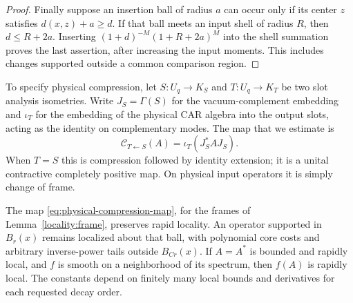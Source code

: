 \begin{proof}
Finally suppose an insertion ball of radius $a$ can occur only if
its center $z$ satisfies $d(x,z)+a\geq d$.  If that ball meets an
input shell of radius $R$, then $d\leq R+2a$.  Inserting
$(1+d)^{-M}(1+R+2a)^M$ into the shell summation proves the last
assertion, after increasing the input moments.  This includes changes
supported outside a common comparison region.
\end{proof}

To specify physical compression, let $S:U_q\to K_S$ and
$T:U_q\to K_T$ be two slot analysis isometries.  Write $J_S=\Gamma(S)$
for the vacuum-complement embedding and $\iota_T$ for the embedding of
the physical CAR algebra into the output slots, acting as the identity
on complementary modes.  The map that we estimate is
\begin{equation}
 \mathcal C_{T\leftarrow S}(A)
   =\iota_T(J_S^*AJ_S).
 \label{eq:physical-compression-map}
\end{equation}
When $T=S$ this is compression followed by identity extension; it is
a unital contractive completely positive map.  On physical input
operators it is simply change of frame.

\begin{lemma}
\label{locality:functional-calculus}
The map \eqref{eq:physical-compression-map}, for the frames of
Lemma~\ref{locality:frame}, preserves rapid locality.  An
operator supported in $B_r(x)$ remains localized about that ball,
with polynomial core costs and arbitrary inverse-power tails outside
$B_{Cr}(x)$.  If $A=A^*$ is bounded and rapidly local, and $f$ is
smooth on a neighborhood of its spectrum, then $f(A)$ is rapidly
local.  The constants depend on finitely many local bounds and
derivatives for each requested decay order.
\end{lemma}


